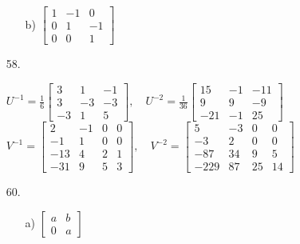 \documentclass[11pt]{amsbook}
\begin{document}
\begin{enumerate}
\begin{multicols}{2}
\begin{enumerate}
                \item[b)]
                    $
		      \begin{bmatrix}
			1  & -1 & 0 	\\
			0  & 1  & -1 	\\
			0  & 0  & 1
		      \end{bmatrix}
                    $

            \end{enumerate}
        \end{multicols}
    
    
    \item[58.]

      $
	U^{-1} = \frac{1}{6}	\begin{bmatrix}
				   3  &  1  &  -1   \\
				   3  & -3  &  -3   \\
				  -3  &  1  &   5
				\end{bmatrix}
	,\quad
	U^{-2} = \frac{1}{36}	\begin{bmatrix}
				   15  &  -1  &  -11   \\
				    9  &   9  &   -9   \\
				  -21  &  -1  &   25
				\end{bmatrix}
      $
      \hNewLine \hNewLine \hNewLine
      $
	V^{-1} = 	\begin{bmatrix}
			    2  &  -1  &  0  &  0   \\
			   -1  &   1  &  0  &  0   \\
			  -13  &   4  &  2  &  1   \\
			  -31  &   9  &  5  &  3
			\end{bmatrix}			
      ,\quad      
      V^{-2} = 		\begin{bmatrix}
			     5  &  -3  &   0  &   0   \\
			    -3  &   2  &   0  &   0   \\
			   -87  &  34  &   9  &   5   \\
			  -229  &  87  &  25  &  14
			\end{bmatrix}
      $


    \item[60.]
    
        \begin{multicols}{2}
            \begin{enumerate}
            
                \item[a)]
                    $
		      \begin{bmatrix}
			a & b   \\
			0 & a
		      \end{bmatrix}
                    $


\end{enumerate}
\end{multicols}
\end{enumerate}
\end{document}
